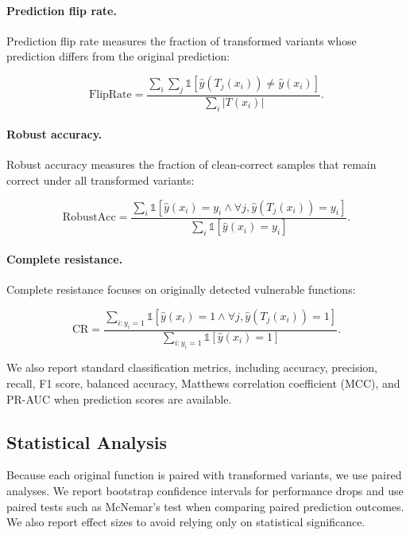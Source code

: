 \documentclass[a4paper,fleqn]{cas-dc}
\begin{document}
\paragraph{Prediction flip rate.}
Prediction flip rate measures the fraction of transformed variants whose
prediction differs from the original prediction:

\begin{equation}
\text{FlipRate} =
\frac{\sum_i \sum_j \mathbb{1}[\hat{y}(T_j(x_i)) \neq \hat{y}(x_i)]}
{\sum_i |T(x_i)|}.
\end{equation}

\paragraph{Robust accuracy.}
Robust accuracy measures the fraction of clean-correct samples that remain
correct under all transformed variants:

\begin{equation}
\text{RobustAcc} =
\frac{\sum_i \mathbb{1}[\hat{y}(x_i)=y_i \land \forall j,\hat{y}(T_j(x_i))=y_i]}
{\sum_i \mathbb{1}[\hat{y}(x_i)=y_i]}.
\end{equation}

\paragraph{Complete resistance.}
Complete resistance focuses on originally detected vulnerable functions:

\begin{equation}
\text{CR} =
\frac{\sum_{i:y_i=1} \mathbb{1}[\hat{y}(x_i)=1 \land \forall j,\hat{y}(T_j(x_i))=1]}
{\sum_{i:y_i=1} \mathbb{1}[\hat{y}(x_i)=1]}.
\end{equation}

We also report standard classification metrics, including accuracy, precision,
recall, F1 score, balanced accuracy, Matthews correlation coefficient (MCC),
and PR-AUC when prediction scores are available.

\subsection{Statistical Analysis}

Because each original function is paired with transformed variants, we use
paired analyses. We report bootstrap confidence intervals for performance
drops and use paired tests such as McNemar's test when comparing paired
prediction outcomes. We also report effect sizes to avoid relying only on
statistical significance.
\end{document}
